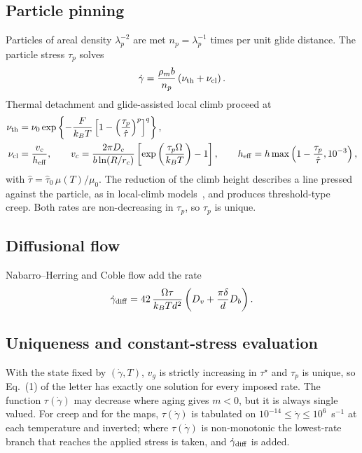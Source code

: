 \documentclass[aps,prl,onecolumn,superscriptaddress,amsmath,amssymb,floatfix]{revtex4-2}
\newcommand{\gd}{\dot\gamma}
\newcommand{\ts}{\tau^{\star}}
\newcommand{\kT}{k_BT}
\begin{document}
\subsection{Particle pinning}
Particles of areal density $\lambda_p^{-2}$ are met $n_p=\lambda_p^{-1}$ times per unit glide distance. The particle stress $\tau_p$ solves
\begin{equation}
\gd=\frac{\rho_mb}{n_p}\left(\nu_{\rm th}+\nu_{\rm cl}\right).
\end{equation}
Thermal detachment and glide-assisted local climb proceed at
\begin{align}
\nu_{\rm th}&=\nu_0\exp\left\{-\frac{F}{\kT}\left[1-\left(\frac{\tau_p}{\hat\tau}\right)^p\right]^q\right\},\\
\nu_{\rm cl}&=\frac{v_c}{h_{\rm eff}},\qquad
v_c=\frac{2\pi D_c}{b\ln(R/r_c)}\left[\exp\left(\frac{\tau_p\Omega}{\kT}\right)-1\right],\qquad
h_{\rm eff}=h\max\left(1-\frac{\tau_p}{\hat\tau},10^{-3}\right),
\end{align}
with $\hat\tau=\hat\tau_0\,\mu(T)/\mu_0$. The reduction of the climb height describes a line pressed against the particle, as in local-climb models~\cite{S_BrownHam}, and produces threshold-type creep. Both rates are non-decreasing in $\tau_p$, so $\tau_p$ is unique.

\subsection{Diffusional flow}
Nabarro--Herring and Coble flow add the rate
\begin{equation}
\gd_{\rm diff}=42\,\frac{\Omega\tau}{\kT d^2}\left(D_v+\frac{\pi\delta}{d}D_b\right).
\end{equation}

\subsection{Uniqueness and constant-stress evaluation}
With the state fixed by $(\gd,T)$, $v_g$ is strictly increasing in $\ts$ and $\tau_p$ is unique, so Eq.~(1) of the letter has exactly one solution for every imposed rate. The function $\tau(\gd)$ may decrease where aging gives $m<0$, but it is always single valued. For creep and for the maps, $\tau(\gd)$ is tabulated on $10^{-14}\le\gd\le10^{6}$~s$^{-1}$ at each temperature and inverted; where $\tau(\gd)$ is non-monotonic the lowest-rate branch that reaches the applied stress is taken, and $\gd_{\rm diff}$ is added.
\end{document}
